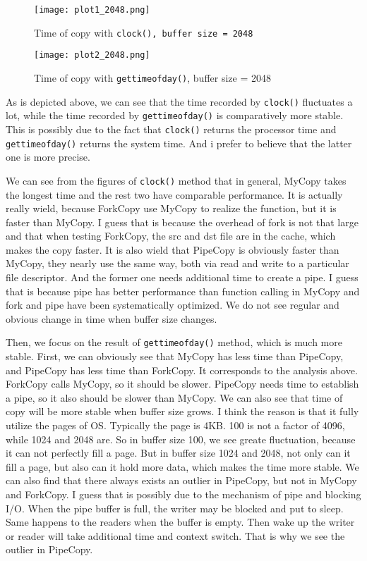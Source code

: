 \begin{figure}[!h]
    \begin{minipage}{0.45\textwidth}
        \centering
        \texttt{[image: plot1\_2048.png]}
        \caption{Time of copy with \texttt{clock(), buffer size = 2048}}
        \label{fig:copy5}
    \end{minipage}\hfill
    \begin{minipage}{0.45\textwidth}
        \centering
        \texttt{[image: plot2\_2048.png]}
        \caption{Time of copy with \texttt{gettimeofday()}, buffer size = 2048}
        \label{fig:copy6}
    \end{minipage}
\end{figure}

As is depicted above, we can see that the time recorded by \texttt{clock()} fluctuates a lot, while the time recorded by \texttt{gettimeofday()} is comparatively more stable.
This is possibly due to the fact that \texttt{clock()} returns the processor time and \texttt{gettimeofday()} returns the system time.
And i prefer to believe that the latter one is more precise.

We can see from the figures of \texttt{clock()} method that in general, MyCopy takes the longest time and the rest two have comparable performance.
It is actually really wield, because ForkCopy use MyCopy to realize the function, but it is faster than MyCopy. I guess that is because the overhead of fork is not that large and that 
when testing ForkCopy, the src and dst file are in the cache, which makes the copy faster. It is also wield that PipeCopy is obviously faster than MyCopy, 
they nearly use the same way, both via read and write to a particular file descriptor. And the former one needs additional time to create a pipe.
I guess that is because pipe has better performance than function calling in MyCopy and fork and pipe have been systematically optimized.
We do not see regular and obvious change in time when buffer size changes. 

Then, we focus on the result of \texttt{gettimeofday()} method, which is much more stable.
First, we can obviously see that MyCopy has less time than PipeCopy, and PipeCopy has less time than ForkCopy. It corresponds to the analysis above. ForkCopy calls MyCopy, so it should be slower.
PipeCopy needs time to establish a pipe, so it also should be slower than MyCopy. We can also see that time of copy will be more stable when buffer size grows.
I think the reason is that it fully utilize the pages of OS. Typically the page is 4KB. 100 is not a factor of 4096, while 1024 and 2048 are. So in buffer size 100, we see greate fluctuation, because 
it can not perfectly fill a page. But in buffer size 1024 and 2048, not only can it fill a page, but also can it hold more data, which makes the time more stable.
We can also find that there always exists an outlier in PipeCopy, but not in MyCopy and ForkCopy. 
I guess that is possibly due to the mechanism of pipe and blocking I/O. When the pipe buffer is full, the writer may be blocked and put to sleep. Same happens to the readers when the buffer is empty.
Then wake up the writer or reader will take additional time and context switch. That is why we see the outlier in PipeCopy.

